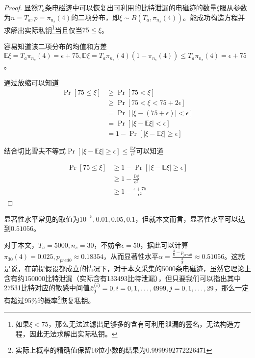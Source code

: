 {{\begin{proof}
		
		显然$T_a$条电磁迹中可以恢复出可利用的比特泄漏的电磁迹的数量$\xi$服从参数为$n=T_a,p=\pi_{n_s}(4)$的二项分布，即$\xi\sim B(T_a,\pi_{n_s}(4))$。能成功构造方程并求解出实际私钥\footnote{如果$\xi<75$，那么无法过滤出足够多的含有可利用泄漏的签名，无法构造方程，因此无法求解出实际私钥。}当且仅当$75\le\xi$。
		
		容易知道该二项分布的均值和方差$\mathbb E\xi=T_a\pi_{n_s}(4)=\epsilon+75,\mathbb D\xi=T_a\pi_{n_s}(4)(1-\pi_{n_s}(4))\le T_a\pi_{n_s}(4)=\epsilon+75$。
		
		通过放缩可以知道\begin{align*}
		\Pr\left[75\le\xi\right]&\ge\Pr\left[75<\xi\right]\\
		&\ge\Pr\left[75<\xi<75+2\epsilon\right]\\
		&=\Pr\left[\vert \xi-(75+\epsilon)\vert<\epsilon\right]\\
		&=\Pr\left[\vert \xi-\mathbb E\xi\vert<\epsilon\right]\\
		&=1-\Pr\left[\vert \xi-\mathbb E\xi\vert\ge\epsilon\right]
		\end{align*}
		
		结合切比雪夫不等式$\Pr\left[\vert \xi-\mathbb E\xi\vert\ge\epsilon\right]\le \frac{\mathbb D\xi}{\epsilon^2}$可以知道
		
		\begin{align*}
		\Pr\left[75\le\xi\right]&\ge1-\Pr\left[\vert \xi-\mathbb E\xi\vert\ge\epsilon\right]\\
		&\ge 1-\frac{\mathbb D\xi}{\epsilon^2}\\
		&\ge1-\frac{\epsilon+75}{\epsilon^2}
		\end{align*}
		
	\end{proof}

	显著性水平常见的取值为$10^{-5},0.01,0.05,0.1$，但就本文而言，显著性水平可以达到$0.51056$。
	
	对于本文，$T_a=5000,n_s=30$，不妨令$\epsilon=50$，据此可以计算$\pi_{30}(4)=0.025,p_{pred0}\approx0.18354$，从而显著性水平$\alpha=\frac{\frac38-p_{pred0}}{\frac38}\approx0.51056$。这就是说，在前提假设都成立的情况下，对于本文采集的5000条电磁迹，虽然它理论上含有约150000比特泄漏（实际含有133493比特泄漏），但只要我们可以指出其中27531比特对应的敏感中间值$\hat{x}^{(i)}_j=0,i=0,1,\dots,4999,j=0,1,\dots,29$，那么一定有超过95\%的概率\footnote{实际上概率的精确值保留16位小数的结果为0.9999992772226471}恢复私钥。
	
}}
